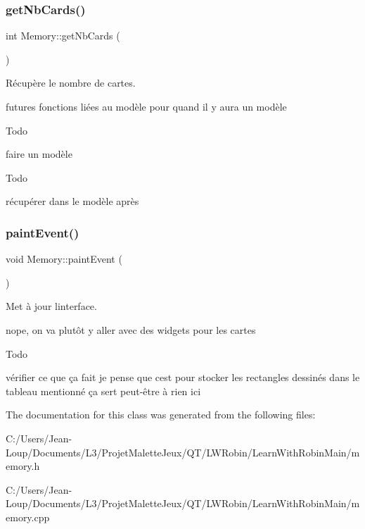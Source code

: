\subsubsection{\texorpdfstring{get\+Nb\+Cards()}{getNbCards()}}
{\footnotesize\ttfamily int Memory\+::get\+Nb\+Cards (\begin{DoxyParamCaption}\item[{void}]{ }\end{DoxyParamCaption})}



Récupère le nombre de cartes. 

futures fonctions liées au modèle pour quand il y aura un modèle \begin{DoxyRefDesc}{Todo}
\item[\hyperlink{todo__todo000005}{Todo}]faire un modèle \end{DoxyRefDesc}
\begin{DoxyRefDesc}{Todo}
\item[\hyperlink{todo__todo000006}{Todo}]récupérer dans le modèle après \end{DoxyRefDesc}
\mbox{\label{class_memory_ad9a06b40d30c5ee3bbccacb37795255b}} 
\subsubsection{\texorpdfstring{paint\+Event()}{paintEvent()}}
{\footnotesize\ttfamily void Memory\+::paint\+Event (\begin{DoxyParamCaption}\item[{Q\+Paint\+Event $\ast$}]{ }\end{DoxyParamCaption})}



Met à jour l\textquotesingle{}interface. 

nope, on va plutôt y aller avec des widgets pour les cartes \begin{DoxyRefDesc}{Todo}
\item[\hyperlink{todo__todo000004}{Todo}]vérifier ce que ça fait je pense que c\textquotesingle{}est pour stocker les rectangles dessinés dans le tableau mentionné ça sert peut-\/être à rien ici \end{DoxyRefDesc}


The documentation for this class was generated from the following files\+:\begin{DoxyCompactItemize}
\item 
C\+:/\+Users/\+Jean-\/\+Loup/\+Documents/\+L3/\+Projet\+Malette\+Jeux/\+Q\+T/\+L\+W\+Robin/\+Learn\+With\+Robin\+Main/memory.\+h\item 
C\+:/\+Users/\+Jean-\/\+Loup/\+Documents/\+L3/\+Projet\+Malette\+Jeux/\+Q\+T/\+L\+W\+Robin/\+Learn\+With\+Robin\+Main/memory.\+cpp\end{DoxyCompactItemize}
